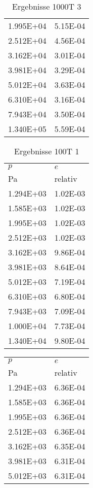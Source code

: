 \begin{table}
\begin{tabular}{l l }
\num{1.995E+04}&\num{5.15E-04}\\
\num{2.512E+04}&\num{4.56E-04}\\
\num{3.162E+04}&\num{3.01E-04}\\
\num{3.981E+04}&\num{3.29E-04}\\
\num{5.012E+04}&\num{3.63E-04}\\
\num{6.310E+04}&\num{3.16E-04}\\
\num{7.943E+04}&\num{3.50E-04}\\
\num{1.340E+05}&\num{5.59E-04}\\
\bottomrule
\end{tabular}\caption{Ergebnisse 1000T 3}\end{table}\begin{table}\begin{tabular}{l l }
\toprule
$p$&$e$\\
 Pa & relativ \\\midrule
\num{1.294E+03}&\num{1.02E-03}\\
\num{1.585E+03}&\num{1.02E-03}\\
\num{1.995E+03}&\num{1.02E-03}\\
\num{2.512E+03}&\num{1.02E-03}\\
\num{3.162E+03}&\num{9.86E-04}\\
\num{3.981E+03}&\num{8.64E-04}\\
\num{5.012E+03}&\num{7.19E-04}\\
\num{6.310E+03}&\num{6.80E-04}\\
\num{7.943E+03}&\num{7.09E-04}\\
\num{1.000E+04}&\num{7.73E-04}\\
\num{1.340E+04}&\num{9.80E-04}\\
\bottomrule
\end{tabular}\caption{Ergebnisse 100T 1}\end{table}\begin{table}\begin{tabular}{l l }
\toprule
$p$&$e$\\
 Pa & relativ \\\midrule
\num{1.294E+03}&\num{6.36E-04}\\
\num{1.585E+03}&\num{6.36E-04}\\
\num{1.995E+03}&\num{6.36E-04}\\
\num{2.512E+03}&\num{6.36E-04}\\
\num{3.162E+03}&\num{6.35E-04}\\
\num{3.981E+03}&\num{6.31E-04}\\
\num{5.012E+03}&\num{6.31E-04}\\

\end{tabular}
\end{table}
